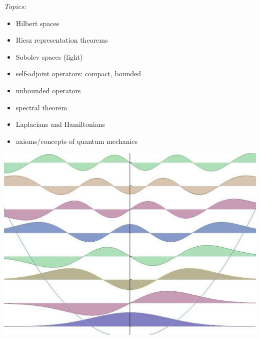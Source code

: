 \documentclass[12pt]{amsart}
\begin{document}
\bigskip \noindent 
\begin{minipage}[t]{0.55\textwidth} \emph{Topics:}
\begin{itemize}
\item Hilbert spaces
\item Riesz representation theorems
\item Sobolev spaces (light)
\item self-adjoint operators: compact, bounded
\item unbounded operators
\item spectral theorem
\item Laplacians and Hamiltonians
\item axioms/concepts of quantum mechanics
\end{itemize}
\end{minipage}
\hfill
\begin{minipage}[t]{0.4\textwidth}
\smallskip

\centering
\includegraphics[width=\textwidth]{../../images/harmonic.jpg}
\end{minipage}
\end{document}
